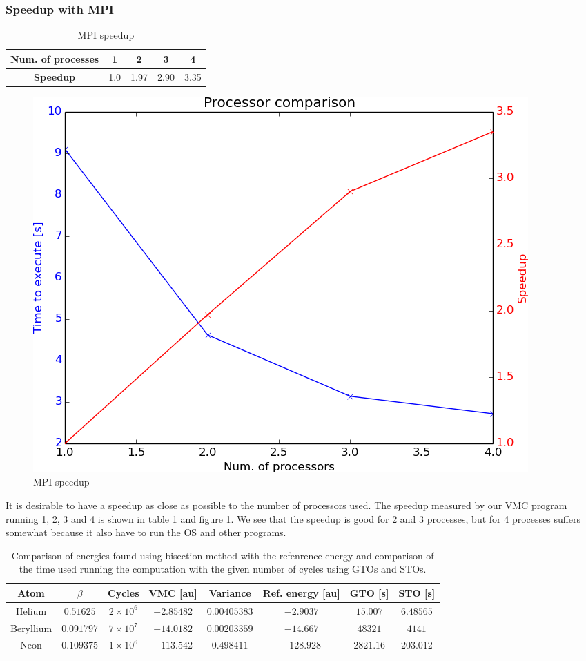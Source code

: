 	


	\subsubsection{Speedup with MPI}
		\begin{table}
			\center
			\begin{tabular}{| c | c| c| c| c|}
				\hline
					\textbf{Num. of processes} &	1	&	2	&	3	&	4
				\\ \hline
				\textbf{Speedup}	&	1.0	&	1.97	&	2.90	&	3.35
				\\	\hline
			\end{tabular}
			\caption{MPI speedup}
			\label{tab:MPI_speedup}
		\end{table}

		\begin{figure}
			\centering \includegraphics[width=0.45\linewidth]{../figures/processor_number_time_comparison}
			\protect\caption{MPI speedup}
			\label{fig:MPI_speedup}
		\end{figure}

		It is desirable to have a speedup as close as possible to the number of processors used. The speedup measured by our VMC program running 1, 2, 3 and 4 is shown in table \ref{tab:MPI_speedup} and figure \ref{fig:MPI_speedup}. We see that the speedup is good for 2 and 3 processes, but for 4 processes suffers somewhat because it also have to run the OS and other programs.


		\begin{table}
			\center %
			\begin{tabular}{|c|c|c|c|c|c|c|c|}
				\hline 
				Atom  & $\beta$ & Cycles & VMC {[}au{]} & Variance & Ref. energy {[}au{]} & GTO [s] & STO [s] \tabularnewline
				\hline 
				Helium &  $0.51625$ & $2\times 10^{6}$ & $-2.85482$ & $0.00405383$ & $-2.9037$ & $15.007$ & $6.48565$ \tabularnewline
				\hline 
				Beryllium  &  $0.091797$ & $7\times 10^{7}$ & $-14.0182$ & $0.00203359$ & $-14.667$ & $48321$ & $4141$ \tabularnewline
				\hline 
				Neon  & $0.109375$ & $1\times 10^{6}$ & $-113.542$ & $0.498411$ & $-128.928$ & $2821.16$ & $203.012$ \tabularnewline
				\hline 
			\end{tabular}\protect\caption{ Comparison of energies found using bisection method with the refenrence energy \parencite{Koput_2011_PCCP} \parencite{Binkley_1975} and comparison of the time used running the computation with the given number of cycles using GTOs and STOs.}
			\label{tab:AtomsGTO} 
		\end{table}


